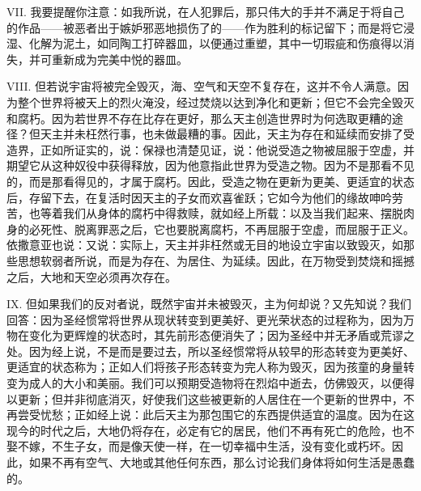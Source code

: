 VII. 我要提醒你注意：如我所说，在人犯罪后，那只伟大的手并不满足于将自己的作品——被恶者出于嫉妒邪恶地损伤了的——作为胜利的标记留下；而是将它浸湿、化解为泥土，如同陶工打碎器皿，以便通过重塑，其中一切瑕疵和伤痕得以消失，并可重新成为完美中悦的器皿。\par

VIII. 但若说宇宙将被完全毁灭，海、空气和天空不复存在，这并不令人满意。因为整个世界将被天上的烈火淹没，经过焚烧以达到净化和更新；但它不会完全毁灭和腐朽。因为若世界不存在比存在更好，那么天主创造世界时为何选取更糟的途径？但天主并未枉然行事，也未做最糟的事。因此，天主为存在和延续而安排了受造界，正如所证实的，说：保禄也清楚见证，说：他说受造之物被屈服于空虚，并期望它从这种奴役中获得释放，因为他意指此世界为受造之物。因为不是那看不见的，而是那看得见的，才属于腐朽。因此，受造之物在更新为更美、更适宜的状态后，存留下去，在复活时因天主的子女而欢喜雀跃；它如今为他们的缘故呻吟劳苦，也等着我们从身体的腐朽中得救赎，就如经上所载：以及当我们起来、摆脱肉身的必死性、脱离罪恶之后，它也要脱离腐朽，不再屈服于空虚，而屈服于正义。依撒意亚也说：又说：实际上，天主并非枉然或无目的地设立宇宙以致毁灭，如那些思想软弱者所说，而是为存在、为居住、为延续。因此，在万物受到焚烧和摇撼之后，大地和天空必须再次存在。\par

IX. 但如果我们的反对者说，既然宇宙并未被毁灭，主为何却说？又先知说？我们回答：因为圣经惯常将世界从现状转变到更美好、更光荣状态的过程称为，因为万物在变化为更辉煌的状态时，其先前形态便消失了；因为圣经中并无矛盾或荒谬之处。因为经上说，不是而是要过去，所以圣经惯常将从较早的形态转变为更美好、更适宜的状态称为；正如人们将孩子形态转变为完人称为毁灭，因为孩童的身量转变为成人的大小和美丽。我们可以预期受造物将在烈焰中逝去，仿佛毁灭，以便得以更新；但并非彻底消灭，好使我们这些被更新的人居住在一个更新的世界中，不再尝受忧愁；正如经上说：此后天主为那包围它的东西提供适宜的温度。因为在这现今的时代之后，大地仍将存在，必定有它的居民，他们不再有死亡的危险，也不娶不嫁，不生子女，而是像天使一样，在一切幸福中生活，没有变化或朽坏。因此，如果不再有空气、大地或其他任何东西，那么讨论我们身体将如何生活是愚蠢的。\par

